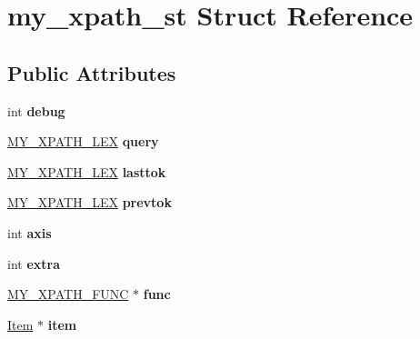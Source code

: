 \hypertarget{structmy__xpath__st}{}\section{my\+\_\+xpath\+\_\+st Struct Reference}
\label{structmy__xpath__st}
\subsection*{Public Attributes}
\begin{DoxyCompactItemize}
\item 
\mbox{\label{structmy__xpath__st_a5dabb82839c8ab362df18882439bbb32}} 
int {\bfseries debug}
\item 
\mbox{\label{structmy__xpath__st_a66900ac6796b134eff1dd7d0fa888e3a}} 
\mbox{\hyperlink{structmy__xpath__lex__st}{M\+Y\+\_\+\+X\+P\+A\+T\+H\+\_\+\+L\+EX}} {\bfseries query}
\item 
\mbox{\label{structmy__xpath__st_ac3cc88a50c7f5ca9d8c2ef6bf7e36b9b}} 
\mbox{\hyperlink{structmy__xpath__lex__st}{M\+Y\+\_\+\+X\+P\+A\+T\+H\+\_\+\+L\+EX}} {\bfseries lasttok}
\item 
\mbox{\label{structmy__xpath__st_a67e1d5f769b7ea54781790547df0aaf2}} 
\mbox{\hyperlink{structmy__xpath__lex__st}{M\+Y\+\_\+\+X\+P\+A\+T\+H\+\_\+\+L\+EX}} {\bfseries prevtok}
\item 
\mbox{\label{structmy__xpath__st_a5fbb68ee3daf0c6e7e7e636fee8ea552}} 
int {\bfseries axis}
\item 
\mbox{\label{structmy__xpath__st_ac1e2b400a0f52cc60ae5517375c75e62}} 
int {\bfseries extra}
\item 
\mbox{\label{structmy__xpath__st_a8487dd1552b115839d19293466814aa2}} 
\mbox{\hyperlink{structmy__xpath__function__names__st}{M\+Y\+\_\+\+X\+P\+A\+T\+H\+\_\+\+F\+U\+NC}} $\ast$ {\bfseries func}
\item 
\mbox{\label{structmy__xpath__st_a9dfd8c8a69ae1c19b5b7db0d91b84df5}} 
\mbox{\hyperlink{classItem}{Item}} $\ast$ {\bfseries item}

\end{DoxyCompactItemize}
